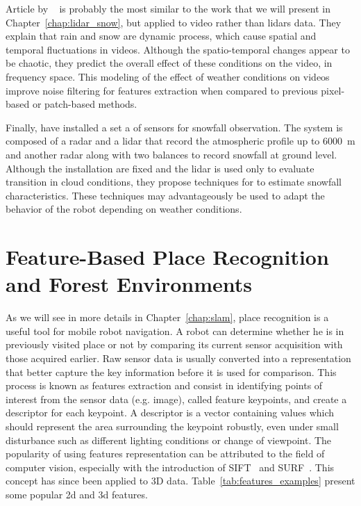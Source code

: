 Article by ~\citet{barnum2010analysis} is probably the most similar to the work that we will present in Chapter~\ref{chap:lidar_snow}, but applied to video rather than \gls*{lidar}s data. They explain that rain and snow are dynamic process, which cause spatial and temporal fluctuations in videos. Although the spatio-temporal changes appear to be chaotic, they predict the overall effect of these conditions on the video, in frequency space. This modeling of the effect of weather conditions on videos improve noise filtering for features extraction when compared to previous pixel-based or patch-based methods.

Finally, \citet{servomaa2002snowfall} have installed a set a of sensors for snowfall observation. The system is composed of a radar and a \gls*{lidar} that record the atmospheric profile up to \SI{6000}{\meter} and another radar along with two balances to record snowfall at ground level. Although the installation are fixed and the \gls*{lidar} is used only to evaluate transition in cloud conditions, they propose techniques for to estimate snowfall characteristics. These techniques may advantageously be used to adapt the behavior of the robot depending on weather conditions.  



\section{Feature-Based Place Recognition and Forest Environments}
\label{sec:literature_slam}

As we will see in more details in Chapter~\ref{chap:slam}, place recognition is a useful tool for mobile robot navigation. A robot can determine whether he is in previously visited place or not by comparing its current sensor acquisition with those acquired earlier. Raw sensor data is usually converted into a representation that better capture the key information before it is used for comparison. This process is known as features extraction and consist in identifying points of interest from the sensor data (e.g. image), called feature keypoints, and create a descriptor for each keypoint. A descriptor is a vector containing values which should represent the area surrounding the keypoint robustly, even under small disturbance such as different lighting conditions or change of viewpoint. The popularity of using features representation can be attributed to the field of computer vision, especially with the introduction of SIFT~\cite{Lowe2004} and SURF~\cite{Bay2006}. This concept has since been applied to 3D data. Table~\ref{tab:features_examples} present some popular \gls*{2d} and \gls*{3d} features. 

